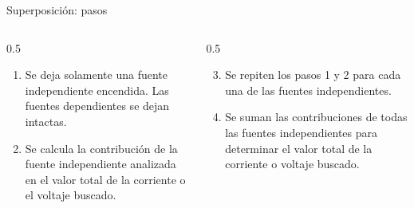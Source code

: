 \documentclass[aspectratio=169]{beamer}
\begin{document}
\begin{frame}{Superposición: pasos}
    \begin{columns}[onlytextwidth,T]
    \begin{column}{0.5\textwidth}
        \begin{enumerate}
            \item<+-> Se deja solamente una fuente independiente encendida. Las fuentes dependientes se dejan intactas.
            \item<+-> Se calcula la contribución de la fuente independiente analizada en el valor total de la corriente o el voltaje buscado.
        \end{enumerate}
    \end{column}
    \begin{column}{0.5\textwidth}
        \begin{enumerate}
        \setcounter{enumi}{2}
            \item<+-> Se repiten los pasos 1 y 2 para cada una de las fuentes independientes.
            \item<+-> Se suman las contribuciones de todas las fuentes independientes para determinar el valor total de la corriente o voltaje buscado. 
        \end{enumerate}
    \end{column}
    \end{columns}
\end{frame}
\end{document}
